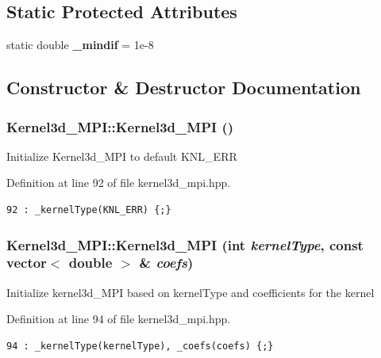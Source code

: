 \subsection*{Static Protected Attributes}
\begin{CompactItemize}
\item 
static double {\bf \_\-mindif} = 1e-8
\end{CompactItemize}


\subsection{Constructor \& Destructor Documentation}
\subsubsection{\setlength{\rightskip}{0pt plus 5cm}Kernel3d\_\-MPI::Kernel3d\_\-MPI ()\hspace{0.3cm}{\tt  [inline]}}\label{classKernel3d__MPI_ec0afb717baf07c9d067fb1bd8e80056_ec0afb717baf07c9d067fb1bd8e80056}


Initialize Kernel3d\_\-MPI to default KNL\_\-ERR 

Definition at line 92 of file kernel3d\_\-mpi.hpp.

\footnotesize\begin{verbatim}92 : _kernelType(KNL_ERR) {;}
\end{verbatim}\normalsize 


\subsubsection{\setlength{\rightskip}{0pt plus 5cm}Kernel3d\_\-MPI::Kernel3d\_\-MPI (int {\em kernel\-Type}, const vector$<$ double $>$ \& {\em coefs})\hspace{0.3cm}{\tt  [inline]}}\label{classKernel3d__MPI_ee7734c35c8da2a2b35b90f53bc89d9a_ee7734c35c8da2a2b35b90f53bc89d9a}


Initialize kernel3d\_\-MPI based on kernel\-Type and coefficients for the kernel 

Definition at line 94 of file kernel3d\_\-mpi.hpp.

\footnotesize\begin{verbatim}94 : _kernelType(kernelType), _coefs(coefs) {;}
\end{verbatim}\normalsize 


